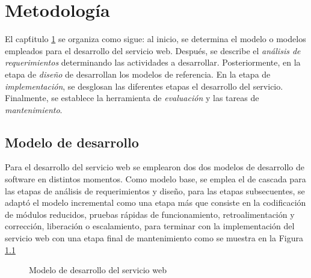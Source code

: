 \renewcommand{\chaptername}{Capitulo}
\chapter{Metodolog\'ia}
\label{Metodologia}

El cap\'titulo \ref{Metodologia} se organiza como sigue: al inicio, se determina el modelo o modelos empleados para el desarrollo del servicio web. Despu\'es, se describe el \textit{an\'alisis de requerimientos} determinando las actividades a desarrollar. Posteriormente, en la etapa de \textit{diseño} de desarrollan los modelos de referencia. En la etapa de \textit{implementación}, se desglosan las diferentes etapas el desarrollo del servicio. Finalmente, se establece la herramienta de \textit{evaluaci\'on} y las tareas de \textit{mantenimiento}.

\section{Modelo de desarrollo}

Para el desarrollo del servicio web se emplearon dos dos modelos de desarrollo de software en distintos momentos. Como modelo base, se emplea el de cascada \cite{IngDeSW} para las etapas de an\'alisis de requerimientos y diseño, para las etapas subsecuentes, se adapt\'o el modelo incremental como una etapa m\'as que consiste en la codificación de módulos reducidos, pruebas rápidas de funcionamiento, retroalimentación y corrección, liberación o escalamiento, para terminar con la implementaci\'on del servicio web con una etapa final de mantenimiento como se muestra en la Figura \ref{modeloDesarrolloSW}

\begin{figure}[!ht]
	\centering
    \caption{Modelo de desarrollo del servicio web} %
    \label{modeloDesarrolloSW}
\end{figure}

